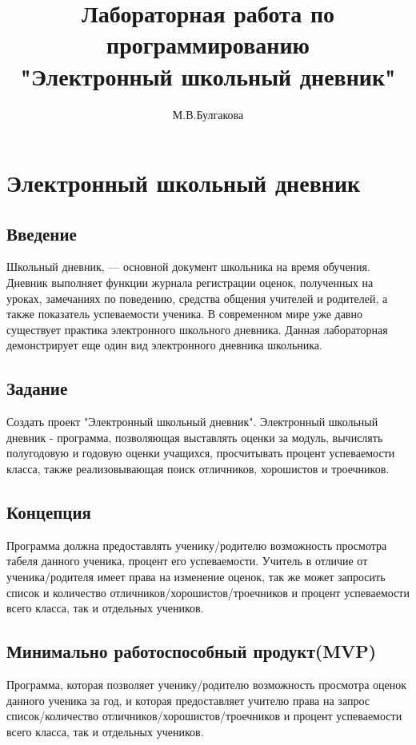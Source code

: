\documentclass[12pt,a4paper]{report}
\author{М.В.Булгакова}
\title{Лабораторная работа по программированию \\ "Электронный школьный дневник"}
\begin{document}
\maketitle
\chapter{Электронный школьный дневник}
\section{Введение}
Школьный дневник, — основной документ школьника на время обучения. Дневник выполняет функции журнала регистрации оценок, полученных на уроках, замечаниях по поведению, средства общения учителей и родителей, а также показатель успеваемости ученика. В современном мире уже давно существует практика электронного школьного дневника. Данная лабораторная демонстрирует еще один вид электронного дневника школьника. 
\section{Задание}

Создать проект "Электронный школьный дневник". Электронный школьный дневник - программа, позволяющая выставлять оценки за модуль, вычислять полугодовую и годовую оценки учащихся, просчитывать процент успеваемости класса, также реализовывающая поиск отличников, хорошистов и троечников.
\section{Концепция}

Программа должна предоставлять ученику/родителю возможность просмотра табеля данного ученика, процент его успеваемости. Учитель в отличие от ученика/родителя имеет права на изменение оценок, так же может запросить список и количество отличников/хорошистов/троечников и процент успеваемости всего класса, так и отдельных учеников.

\section{Минимально работоспособный продукт(MVP)}
Программа, которая позволяет ученику/родителю возможность просмотра оценок данного ученика за год, и которая предоставляет учителю права на запрос список/количество отличников/хорошистов/троечников и процент успеваемости всего класса, так и отдельных учеников.
\end{document}
